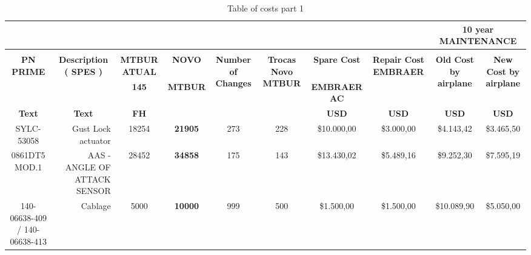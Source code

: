 \begin{table}[htbp]
  \centering
  \caption{Table of costs part 1}
    \begin{tabular}{rrrrrrrrcc}
    \toprule
          &       & \multicolumn{1}{c}{} & \multicolumn{1}{c}{} & \multicolumn{1}{c}{} & \multicolumn{1}{c}{} &       &       & \multicolumn{2}{c}{\multirow{2}[2]{*}{\textbf{10 year MAINTENANCE}}} \\
    \midrule
          &       &       &       &       &       &       &       & \multicolumn{2}{c}{} \\
    \multicolumn{1}{c}{\multirow{2}[2]{*}{\textbf{PN PRIME}}} & \multicolumn{1}{c}{\multirow{2}[2]{*}{\textbf{Description ( SPES )}}} & \multicolumn{1}{c}{\textbf{MTBUR ATUAL}} & \multicolumn{1}{c}{\textbf{NOVO}} & \multicolumn{1}{c}{\multirow{2}[2]{*}{\textbf{Number of Changes}}} & \multicolumn{1}{c}{\multirow{2}[2]{*}{\textbf{Trocas Novo MTBUR}}} & \multicolumn{1}{c}{\textbf{Spare Cost}} & \multicolumn{1}{c}{\multirow{2}[2]{*}{\textbf{Repair Cost EMBRAER}}} & \multirow{2}[2]{*}{\textbf{Old Cost by airplane}} & \multirow{2}[2]{*}{\textbf{New Cost by airplane}} \\
    \multicolumn{1}{c}{} & \multicolumn{1}{c}{} & \multicolumn{1}{c}{\textbf{145}} & \multicolumn{1}{c}{\textbf{MTBUR}} & \multicolumn{1}{c}{} & \multicolumn{1}{c}{} & \multicolumn{1}{c}{\textbf{EMBRAER AC}} & \multicolumn{1}{c}{} &       &  \\
    \multicolumn{1}{c}{\textbf{Text}} & \multicolumn{1}{c}{\textbf{Text}} & \multicolumn{1}{c}{\textbf{FH}} & \multicolumn{1}{c}{\textbf{}} & \multicolumn{1}{c}{\textbf{}} & \multicolumn{1}{c}{\textbf{}} & \multicolumn{1}{c}{\textbf{USD}} & \multicolumn{1}{c}{\textbf{USD}} & \textbf{USD} & \textbf{USD} \\
    \multicolumn{1}{c}{SYLC-53058} & Gust Lock actuator & \multicolumn{1}{c}{18254} & \multicolumn{1}{c}{\textbf{21905}} & \multicolumn{1}{c}{273} & \multicolumn{1}{c}{228} & \multicolumn{1}{c}{\$10.000,00} & \multicolumn{1}{c}{\$3.000,00} & \$4.143,42 & \$3.465,50 \\
    \multicolumn{1}{c}{0861DT5 MOD.1} & AAS - ANGLE OF ATTACK SENSOR & \multicolumn{1}{c}{28452} & \multicolumn{1}{c}{\textbf{34858}} & \multicolumn{1}{c}{175} & \multicolumn{1}{c}{143} & \multicolumn{1}{c}{\$13.430,02} & \multicolumn{1}{c}{\$5.489,16} & \$9.252,30 & \$7.595,19 \\
    \multicolumn{1}{c}{140-06638-409 / 140-06638-413} & Cablage & \multicolumn{1}{c}{5000} & \multicolumn{1}{c}{\textbf{10000}} & \multicolumn{1}{c}{999} & \multicolumn{1}{c}{500} & \multicolumn{1}{c}{\$1.500,00} & \multicolumn{1}{c}{\$1.500,00} & \$10.089,90 & \$5.050,00 \\

\end{tabular}
\end{table}
